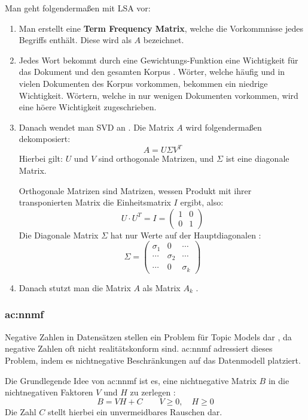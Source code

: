 Man geht folgendermaßen mit LSA vor:
\begin{enumerate}
    \item Man erstellt eine \textbf{Term Frequency Matrix}, welche die Vorkommnisse jedes Begriffs enthält\cite[174]{topicmodelsurvey_padmaja}\cite[4]{Kherwa2020}. Diese wird als $A$ bezeichnet.
    \item Jedes Wort bekommt durch eine Gewichtungs-Funktion eine Wichtigkeit für das Dokument und den gesamten Korpus \cite[4]{Kherwa2020}. Wörter, welche häufig und in vielen Dokumenten des Korpus vorkommen, bekommen ein niedrige Wichtigkeit. Wörtern, welche in nur wenigen Dokumenten vorkommen, wird eine höere Wichtigkeit zugeschrieben.
    \item Danach wendet man SVD an \cite[4]{Kherwa2020}. Die Matrix $A$ wird folgendermaßen dekomposiert:
    \[
    A=U\Sigma V^T
    \]
    Hierbei gilt: $U$ und $V$ sind orthogonale Matrizen, und $\Sigma$ ist eine diagonale Matrix.
    
    Orthogonale Matrizen sind Matrizen, wessen Produkt mit ihrer transponierten Matrix die Einheitsmatrix $I$ ergibt, also:
    \[
    U\cdot U^T = I = \begin{pmatrix}
        1 & 0 \\ 0 & 1
    \end{pmatrix}
    \]
    Die Diagonale Matrix $\Sigma$ hat nur Werte auf der Hauptdiagonalen \cite[4]{Kherwa2020}:
    \[
    \Sigma=\begin{pmatrix}
        \sigma_1 & 0 & \cdots\\
        \cdots & \sigma_2 & \cdots\\
        \cdots & 0 & \sigma_k
    \end{pmatrix}
    \]
    \item Danach stutzt man die Matrix $A$ als Matrix $A_k$ \cite[4]{Kherwa2020}. 
\end{enumerate}

\subsubsection{\acrfull{ac:nnmf}}

Negative Zahlen in Datensätzen stellen ein Problem für Topic Models dar \cite[4]{Kherwa2020}, da negative Zahlen oft nicht realitätskonform sind. \acrshort{ac:nnmf} adressiert dieses Problem, indem es nichtnegative Beschränkungen auf das Datenmodell platziert.

Die Grundlegende Idee von \acrshort{ac:nnmf} ist es, eine nichtnegative Matrix $B$ in die nichtnegativen Faktoren $V$ und $H$ zu zerlegen \cite[4]{Kherwa2020}:
\[
B=VH+C\quad\quad V\geq 0,\quad H\geq 0
\]
Die Zahl $C$ stellt hierbei ein unvermeidbares Rauschen dar.

